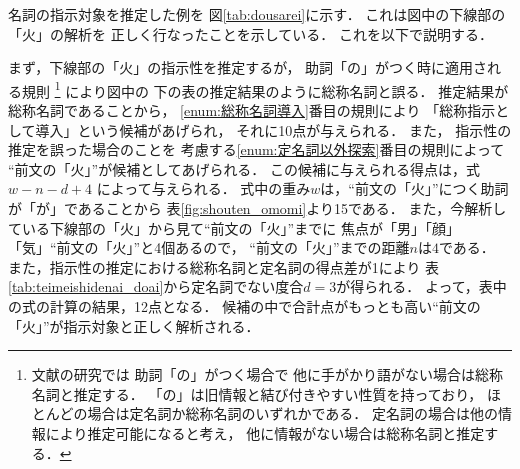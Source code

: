 名詞の指示対象を推定した例を
図\ref{tab:dousarei}に示す．
これは図中の下線部の「火」の解析を
正しく行なったことを示している．
これを以下で説明する．

まず，下線部の「火」の指示性を推定するが，
助詞「の」がつく時に適用される規則
\footnote{
文献\cite{match}の研究では
助詞「の」がつく場合で
他に手がかり語がない場合は総称名詞と推定する．
「の」は旧情報と結び付きやすい性質を持っており，
ほとんどの場合は定名詞か総称名詞のいずれかである．
定名詞の場合は他の情報により推定可能になると考え，
他に情報がない場合は総称名詞と推定する．
}
により図中の
下の表の推定結果のように総称名詞と誤る．
推定結果が総称名詞であることから，
\ref{enum:総称名詞導入}番目の規則により
「総称指示として導入」という候補があげられ，
それに10点が与えられる．
また，
指示性の推定を誤った場合のことを
考慮する\ref{enum:定名詞以外探索}番目の規則によって
``前文の「火」''が候補としてあげられる．
この候補に与えられる得点は，式$w - n - d + 4$
によって与えられる．
式中の重み$w$は，``前文の「火」''につく助詞が「が」であることから
表\ref{fig:shouten_omomi}より15である．
また，今解析している下線部の「火」から見て``前文の「火」''までに
焦点が「男」「顔」「気」``前文の「火」\hspace{-1.4mm}''と4個あるので，
``前文の「火」\hspace{-1.4mm}''までの距離$n$は$4$である．
また，指示性の推定に\mbox{おける}総称名詞と定名詞の得点差が1により
表\ref{tab:teimeishidenai_doai}から定名詞でない度合$d=3$が得られる．
よって，表中の式の計算の結果，12点となる．
候補の中で合計点がもっとも高い``前文の「火」\hspace{-1.4mm}''が\mbox{指示対}象と正しく解析される．


\begin{table*}[t]
\end{table*}


